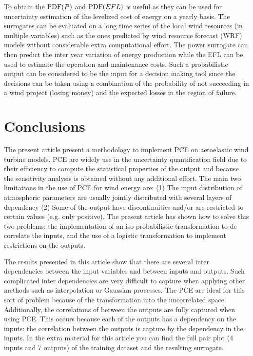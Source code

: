 \documentclass[preprint,12pt]{elsarticle}
\begin{document}
To obtain the $\mathrm{PDF}(P)$ and $\mathrm{PDF}(EFL)$ is useful as they can be used for uncertainty estimation of the levelized cost of energy on a yearly basis. The surrogates can be evaluated on a long time series of the local wind resources (in multiple variables) such as the ones predicted by wind resource forecast (WRF) models without considerable extra computational effort. The power surrogate can then predict the inter year variation of energy production while the EFL can be used to estimate the operation and maintenance costs. Such a probabilistic output can be considered to be the input for a decision making tool since the decisions can be taken using a combination of the probability of not succeeding in a wind project (losing money) and the expected losses in the region of failure.

\section{Conclusions}

The present article present a methodology to implement PCE on aeroelastic wind turbine models. PCE are widely use in the uncertainty quantification field due to their efficiency to compute the statistical properties of the output and because the sensitivity analysis is obtained without any additional effort. The main two limitations in the use of PCE for wind energy are: (1) The input distribution of atmospheric parameters are usually jointly distributed with several layers of dependency (2) Some of the output have discontinuities and/or are restricted to certain values (e.g. only positive). The present article has shown how to solve this two problems: the implementation of an iso-probabilistic transformation to de-correlate the inputs, and  the use of a logistic transformation to implement restrictions on the outputs.

The results presented in this article show that there are several inter dependencies between the input variables and between inputs and outputs. Such complicated inter dependencies are very difficult to capture when applying other methods such as interpolation or Gaussian processes. The PCE are ideal for this sort of problem because of the transformation into the uncorrelated space. Additionally, the correlations of between the outputs are fully captured when using PCE. This occurs because each of the outputs has a dependency on the inputs: the correlation between the outputs is capture by the dependency in the inputs. In the extra material for this article you can find the full pair plot (4 inputs and 7 outputs) of the training dataset and the resulting surrogate.
\end{document}
